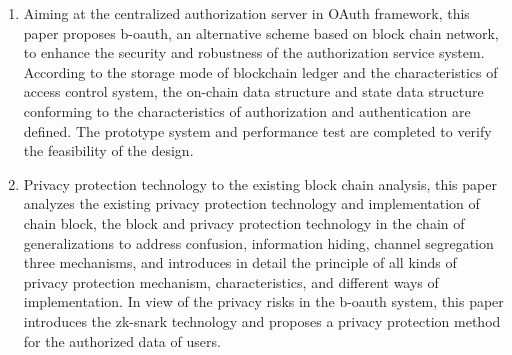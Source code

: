 \begin{abstract*}
  \begin{enumerate}
    \item Aiming at the centralized authorization server in OAuth framework, this paper proposes b-oauth, an alternative scheme based on block chain network, to enhance the security and robustness of the authorization service system. According to the storage mode of blockchain ledger and the characteristics of access control system, the on-chain data structure and state data structure conforming to the characteristics of authorization and authentication are defined. The prototype system and performance test are completed to verify the feasibility of the design.
    \item Privacy protection technology to the existing block chain analysis, this paper analyzes the existing privacy protection technology and implementation of chain block, the block and privacy protection technology in the chain of generalizations to address confusion, information hiding, channel segregation three mechanisms, and introduces in detail the principle of all kinds of privacy protection mechanism, characteristics, and different ways of implementation. In view of the privacy risks in the b-oauth system, this paper introduces the zk-snark technology and proposes a privacy protection method for the authorized data of users.
  \end{enumerate}

\end{abstract*}

